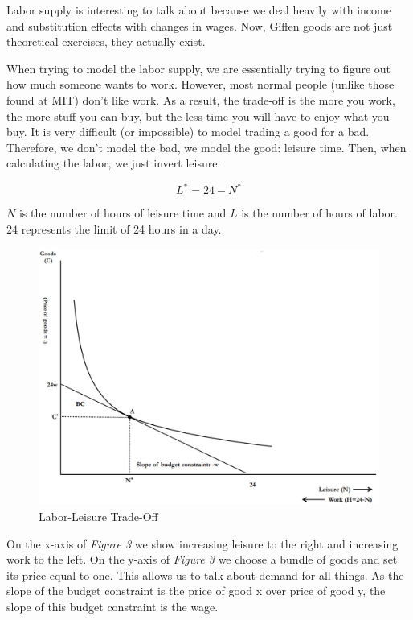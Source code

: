 \documentclass{article}
\begin{document}
Labor supply is interesting to talk about because we deal heavily with income and substitution effects with changes in wages. Now, Giffen goods are not just theoretical exercises, they actually exist.

When trying to model the labor supply, we are essentially trying to figure out how much someone wants to work. However, most normal people (unlike those found at MIT) don't like work. As a result, the trade-off is the more you work, the more stuff you can buy, but the less time you will have to enjoy what you buy. It is very difficult (or impossible) to model trading a good for a bad. Therefore, we don't model the bad, we model the good: leisure time. Then, when calculating the labor, we just invert leisure.

$$L^{*}=24-N^{*}$$

$N$ is the number of hours of leisure time and $L$ is the number of hours of labor. $24$ represents the limit of 24 hours in a day.

\begin{figure}[H]
    \centering
    \includegraphics[scale=0.33]{"Figure 16-3"}
    \caption{Labor-Leisure Trade-Off}
\end{figure}

On the x-axis of \textit{Figure 3} we show increasing leisure to the right and increasing work to the left. On the y-axis of \textit{Figure 3} we choose a bundle of goods and set its price equal to one. This allows us to talk about demand for all things. As the slope of the budget constraint is the price of good x over price of good y, the slope of this budget constraint is the wage. 
\end{document}
